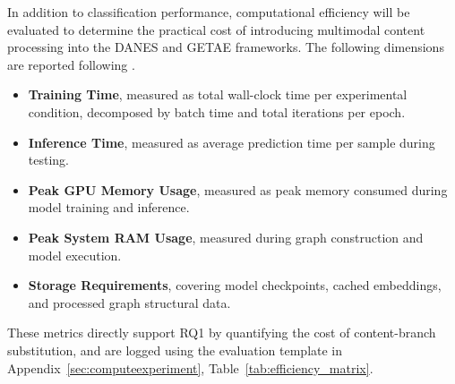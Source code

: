 In addition to classification performance, computational efficiency will be evaluated to determine the practical cost of introducing multimodal content processing into the DANES and GETAE frameworks. The following dimensions are reported following \citet{Justus2018}.

\begin{itemize}
    \item \textbf{Training Time}, measured as total wall-clock time per experimental condition, decomposed by batch time and total iterations per epoch.

    \item \textbf{Inference Time}, measured as average prediction time per sample during testing.

    \item \textbf{Peak GPU Memory Usage}, measured as peak memory consumed during model training and inference.

    \item \textbf{Peak System RAM Usage}, measured during graph construction and model execution.

    \item \textbf{Storage Requirements}, covering model checkpoints, cached embeddings, and processed graph structural data.

\end{itemize}

These metrics directly support RQ1 by quantifying the cost of content-branch substitution, and are logged using the evaluation template in Appendix~\ref{sec:computeexperiment}, Table~\ref{tab:efficiency_matrix}.
